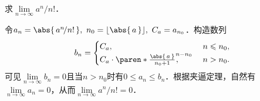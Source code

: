 \begin{example}
  \label{eg:factexp}
  求\(\lim\limits_{n\to\infty} {a^n}\!/{n!}\)． %

  \begin{remark}
    令\(a_n = \abs{\,a^n\!/n!\,},\ n_0 = \floor{\abs{\,a\,}},\ C_a = a_{n_0}\)．构造数列
    \begin{equation*}
      b_n =
      \begin{cases}
        C_a, & n \le n_0, \\
        C_a \cdot \paren*{\frac{\abs{\,a\,}}{n_0 + 1}}^{\mathrlap{n-n_0}}, \qquad & n > n_0.
      \end{cases}
    \end{equation*}
    可见\(\lim\limits_{n\to\infty} b_n = 0\)且当\(n > n_0\)时有\(0 \le a_n \le b_n\)．根据夹逼定理，自然有\(\lim\limits_{n\to\infty} a_n = 0\)，从而\(\lim\limits_{n\to\infty} {a^n}\!/{n!} = 0\)．
  \end{remark}


\end{example}

